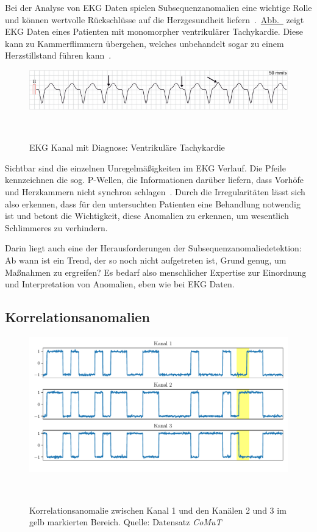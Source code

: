 Bei der Analyse von EKG Daten spielen Subsequenzanomalien eine wichtige Rolle und können wertvolle Rückschlüsse auf die Herzgesundheit
liefern~\cite{Chuah2007}.~\hyperref[fig:ekg_herzerkrankung]{Abb.~} zeigt EKG Daten eines Patienten mit
monomorpher ventrikulärer Tachykardie. Diese kann zu Kammerflimmern übergehen, welches unbehandelt sogar zu einem Herzstillstand
führen kann~\cite{ekgecho}\Cite[S.~131~ff.]{Davies2015}.

\begin{figure}[h]
    \centering
    \includegraphics[width=0.85\linewidth]{ch4_anomalien/abbildungen/ventrikulaere_tachykardie.png}
    \caption{EKG Kanal mit Diagnose: Ventrikuläre Tachykardie~\cite{ekgecho}}
~\label{fig:ekg_herzerkrankung}
\end{figure}

Sichtbar sind die einzelnen Unregelmäßigkeiten im EKG Verlauf. Die Pfeile kennzeichnen die sog. P-Wellen, die Informationen darüber
liefern, dass Vorhöfe und Herzkammern nicht synchron schlagen~\cite{ekgecho}\Cite[S.~31~f.]{Davies2015}. Durch die Irregularitäten lässt
sich also erkennen, dass für den untersuchten Patienten eine Behandlung notwendig ist und betont die Wichtigkeit, diese Anomalien zu
erkennen, um wesentlich Schlimmeres zu verhindern.

Darin liegt auch eine der Herausforderungen der Subsequenzanomaliedetektion: Ab wann ist ein Trend, der so noch nicht aufgetreten ist,
Grund genug, um Maßnahmen zu ergreifen? Es bedarf also menschlicher Expertise zur Einordnung und Interpretation von Anomalien, eben wie
bei EKG Daten.

\subsection{Korrelationsanomalien}

\begin{figure}[H]
    \centering
    \includegraphics[width=0.95\linewidth]{ch4_anomalien/abbildungen/korrelationsanomalie.pdf}
    \caption{\centering Korrelationsanomalie zwischen Kanal 1 und den Kanälen 2 und 3 im gelb markierten Bereich. Quelle: Datensatz
        \textit{CoMuT}~\cite{NaumannCoMuT}}
~\label{fig:correlation_Anomaly}
\end{figure}

